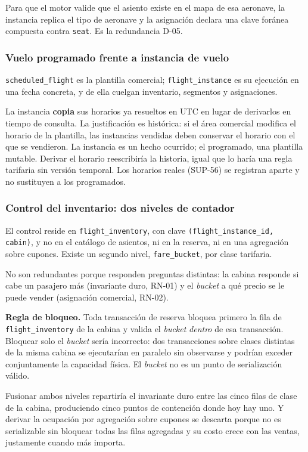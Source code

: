 \documentclass[10pt,letterpaper]{article}
\newcommand{\nota}[1]{%
  \begin{tcolorbox}[colback=cajaFondo,colframe=usaAzul!60,sharp corners=south]#1\end{tcolorbox}}
\begin{document}
Para que el motor valide que el asiento existe en el mapa de esa aeronave, la instancia replica el tipo de aeronave y la asignación declara una clave foránea compuesta contra \texttt{seat}. Es la redundancia D-05.

\subsubsection{Vuelo programado frente a instancia de vuelo}
\texttt{scheduled\_flight} es la plantilla comercial; \texttt{flight\_instance} es su ejecución en una fecha concreta, y de ella cuelgan inventario, segmentos y asignaciones.

La instancia \textbf{copia} sus horarios ya resueltos en UTC en lugar de derivarlos en tiempo de consulta. La justificación es histórica: si el área comercial modifica el horario de la plantilla, las instancias vendidas deben conservar el horario con el que se vendieron. La instancia es un hecho ocurrido; el programado, una plantilla mutable. Derivar el horario reescribiría la historia, igual que lo haría una regla tarifaria sin versión temporal. Los horarios reales (SUP-56) se registran aparte y no sustituyen a los programados.

\subsubsection{Control del inventario: dos niveles de contador}
El control reside en \texttt{flight\_inventory}, con clave \texttt{(flight\_instance\_id, cabin)}, y no en el catálogo de asientos, ni en la reserva, ni en una agregación sobre cupones. Existe un segundo nivel, \texttt{fare\_bucket}, por clase tarifaria.

No son redundantes porque responden preguntas distintas: la cabina responde si cabe un pasajero más (invariante duro, RN-01) y el \emph{bucket} a qué precio se le puede vender (asignación comercial, RN-02).

\nota{\textbf{Regla de bloqueo.} Toda transacción de reserva bloquea primero la fila de \texttt{flight\_inventory} de la cabina y valida el \emph{bucket} \emph{dentro} de esa transacción. Bloquear solo el \emph{bucket} sería incorrecto: dos transacciones sobre clases distintas de la misma cabina se ejecutarían en paralelo sin observarse y podrían exceder conjuntamente la capacidad física. El \emph{bucket} no es un punto de serialización válido.}

Fusionar ambos niveles repartiría el invariante duro entre las cinco filas de clase de la cabina, produciendo cinco puntos de contención donde hoy hay uno. Y derivar la ocupación por agregación sobre cupones se descarta porque no es serializable sin bloquear todas las filas agregadas y su costo crece con las ventas, justamente cuando más importa.
\end{document}
